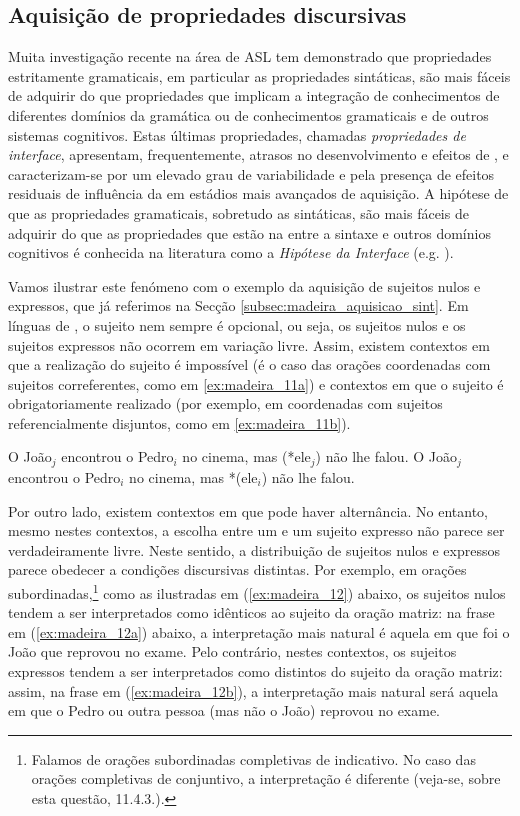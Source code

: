 \documentclass[output=paper]{LSP/langsci}
\begin{document}
\subsection{Aquisição de propriedades discursivas}
\label{subsec:madeira_aquisicao_discurs}
Muita investigação recente na área de ASL tem demonstrado que propriedades estritamente gramaticais, em particular as propriedades sintáticas, são mais fáceis de adquirir do que propriedades que implicam a integração de conhecimentos de diferentes domínios da gramática ou de conhecimentos gramaticais e de outros sistemas cognitivos. Estas últimas propriedades, chamadas \textit{propriedades de interface}, apresentam, frequentemente, atrasos no desenvolvimento e efeitos de , e caracterizam-se por um elevado grau de variabilidade e pela presença de efeitos residuais de influência da  em estádios mais avançados de aquisição. A hipótese de que as propriedades gramaticais, sobretudo as sintáticas, são mais fáceis de adquirir do que as propriedades que estão na  entre a sintaxe e outros domínios cognitivos é conhecida na literatura como a \textit{Hipótese da Interface} (e.g. \citealt{soracefiliaci2006}).

Vamos ilustrar este fenómeno com o exemplo da aquisição de sujeitos nulos e expressos, que já referimos na Secção \ref{subsec:madeira_aquisicao_sint}. Em línguas de , o sujeito nem sempre é opcional, ou seja, os sujeitos nulos e os sujeitos expressos não ocorrem em variação livre. Assim, existem contextos em que a realização do sujeito é impossível (é o caso das orações coordenadas com sujeitos correferentes, como em \ref{ex:madeira_11a}) e contextos em que o sujeito é obrigatoriamente realizado (por exemplo, em coordenadas com sujeitos referencialmente disjuntos, como em \ref{ex:madeira_11b}).

\ea\label{ex:madeira_11}
\ea\label{ex:madeira_11a} O João$_j$ encontrou o Pedro$_i$ no cinema, mas (*ele$_j$) não lhe falou.
\ex\label{ex:madeira_11b} O João$_j$ encontrou o Pedro$_i$ no cinema, mas *(ele$_i$) não lhe falou.
\zl

Por outro lado, existem contextos em que pode haver alternância. No entanto, mesmo nestes contextos, a escolha entre um  e um sujeito expresso não parece ser verdadeiramente livre. Neste sentido, a distribuição de sujeitos nulos e expressos parece obedecer a condições discursivas distintas. Por exemplo, em orações subordinadas,\footnote{Falamos de orações subordinadas completivas de indicativo. No caso das orações completivas de conjuntivo, a interpretação é diferente (veja-se, sobre esta questão, 11.4.3.).} como as ilustradas em (\ref{ex:madeira_12}) abaixo, os sujeitos nulos tendem a ser interpretados como idênticos ao sujeito da oração matriz: na frase em (\ref{ex:madeira_12a}) abaixo, a interpretação mais natural é aquela em que foi o João que reprovou no exame. Pelo contrário, nestes contextos, os sujeitos expressos tendem a ser interpretados como distintos do sujeito da oração matriz: assim, na frase em (\ref{ex:madeira_12b}), a interpretação mais natural será aquela em que o Pedro ou outra pessoa (mas não o João) reprovou no exame.
\end{document}
